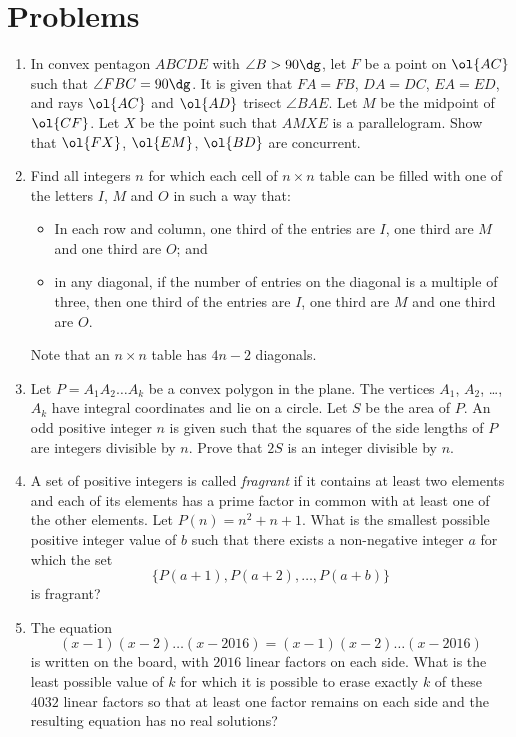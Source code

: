 \documentclass[11pt]{scrartcl}
\begin{document}
\section{Problems}
\begin{enumerate}[\bfseries 1.]
\item %
In convex pentagon $ABCDE$ with $\angle B > 90\dg$,
let $F$ be a point on $\ol{AC}$ such that $\angle FBC = 90\dg$.
It is given that $FA=FB$, $DA=DC$, $EA=ED$,
and rays $\ol{AC}$ and $\ol{AD}$ trisect $\angle BAE$.
Let $M$ be the midpoint of $\ol{CF}$.
Let $X$ be the point such that $AMXE$ is a parallelogram.
Show that $\ol{FX}$, $\ol{EM}$, $\ol{BD}$ are concurrent.

\item %
Find all integers $n$ for which each cell of $n \times n$ table
can be filled with one of the letters $I$, $M$ and $O$ in such a way that:
\begin{itemize}
\item In each row and column,  one third of the entries are $I$,
one third are $M$ and one third are $O$; and
\item in any diagonal, if the number of entries on the diagonal is a multiple of three,
then one third of the entries are $I$, one third are $M$ and one third are $O$.
\end{itemize}
Note that an $n \times n$ table has $4n-2$ diagonals.

\item %
Let $P=A_1A_2\dots A_k$ be a convex polygon in the plane.
The vertices $A_1$, $A_2$, \dots, $A_k$ have integral coordinates
and lie on a circle. Let $S$ be the area of $P$.
An odd positive integer $n$ is given such that
the squares of the side lengths of $P$ are integers divisible by $n$.
Prove that $2S$ is an integer divisible by $n$.

\item %
A set of positive integers is called \emph{fragrant}
if it contains at least two elements and each of its elements
has a prime factor in common with at least one of the other elements.
Let $P(n)=n^2+n+1$.
What is the smallest possible positive integer value of $b$ such that
there exists a non-negative integer $a$ for which the set
\[ \{P(a+1),P(a+2),\dots,P(a+b)\} \]
is fragrant?

\item %
The equation
\[ (x-1)(x-2)\dots(x-2016)=(x-1)(x-2)\dots (x-2016) \]
is written on the board, with $2016$ linear factors on each side.
What is the least possible value of $k$ for which it is possible to
erase exactly $k$ of these $4032$ linear factors so that at least
one factor remains on each side and the resulting equation
has no real solutions?


\end{enumerate}
\end{document}
